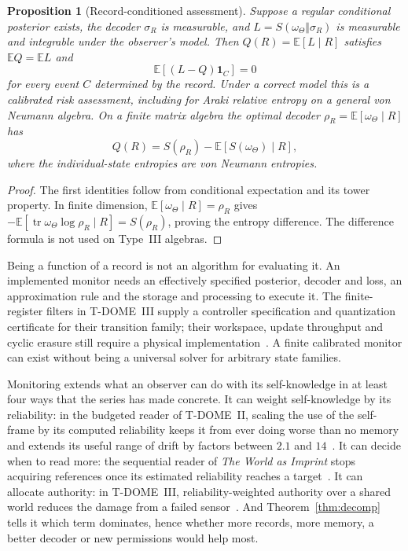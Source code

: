 \documentclass[12pt]{article}
\newtheorem{proposition}[theorem]{Proposition}
\theoremstyle{definition}
\theoremstyle{remark}
\newcommand{\E}{\mathbb E}
\newcommand{\tr}{\operatorname{tr}}
\begin{document}
\begin{proposition}[Record-conditioned assessment]\label{prop:monitor}
Suppose a regular conditional posterior exists, the decoder $\sigma_R$ is measurable, and $L=S(\omega_\Theta\Vert\sigma_R)$ is measurable and integrable under the observer's model. Then $Q(R)=\E[L\mid R]$ satisfies $\E Q=\E L$ and
\[
\E[(L-Q)\mathbf1_C]=0
\]
for every event $C$ determined by the record. Under a correct model this is a calibrated risk assessment, including for Araki relative entropy on a general von Neumann algebra. On a finite matrix algebra the optimal decoder $\rho_R=\E[\omega_\Theta\mid R]$ has
\[
Q(R)=S(\rho_R)-\E[S(\omega_\Theta)\mid R],
\]
where the individual-state entropies are von Neumann entropies.
\end{proposition}

\begin{proof}
The first identities follow from conditional expectation and its tower property. In finite dimension, $\E[\omega_\Theta\mid R]=\rho_R$ gives $-\E[\tr\omega_\Theta\log\rho_R\mid R]=S(\rho_R)$, proving the entropy difference. The difference formula is not used on Type~III algebras.
\end{proof}

Being a function of a record is not an algorithm for evaluating it. An implemented monitor needs an effectively specified posterior, decoder and loss, an approximation rule and the storage and processing to execute it. The finite-register filters in T-DOME~III supply a controller specification and quantization certificate for their transition family; their workspace, update throughput and cyclic erasure still require a physical implementation~\cite{TDOMEIII}. A finite calibrated monitor can exist without being a universal solver for arbitrary state families.

Monitoring extends what an observer can do with its self-knowledge in at least four ways that the series has made concrete. It can weight self-knowledge by its reliability: in the budgeted reader of T-DOME~II, scaling the use of the self-frame by its computed reliability keeps it from ever doing worse than no memory and extends its useful range of drift by factors between $2.1$ and $14$~\cite{TDOMEII}. It can decide when to read more: the sequential reader of \emph{The World as Imprint} stops acquiring references once its estimated reliability reaches a target~\cite{WorldImprint}. It can allocate authority: in T-DOME~III, reliability-weighted authority over a shared world reduces the damage from a failed sensor~\cite{TDOMEIII}. And Theorem~\ref{thm:decomp} tells it which term dominates, hence whether more records, more memory, a better decoder or new permissions would help most.
\end{document}
